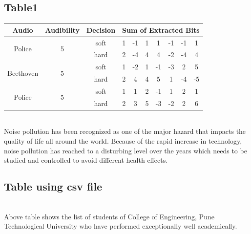 \documentclass{article}
\begin{document}
\subsection{Table1}
\begin{tabular}{|c|c|c|c|c|c|c|c|c|c|}
\hline 
Audio & Audibility & Decision  & \multicolumn{7}{|c|}{Sum of Extracted Bits}\\
\hline
\multirow{2}{*}{Police} & \multirow{2}{*}{5} & soft & 1 & -1 & 1 & 1 & -1 & -1 & 1\\ 
&  & hard & 2 & -4 & 4 & 4 & -2 & -4 & 4\\ \hline
\multirow{2}{*}{Beethoven} & \multirow{2}{*}{5} & soft & 1 & -2 & 1 & -1 & -3 & 2 & 5\\
 &  & hard & 2 & 4 & 4 & 5 & 1 & -4 & -5\\ \hline
\multirow{2}{*}{Police} & \multirow{2}{*}{5} & soft & 1 & 1 & 2 & -1 & 1 & 2 & 1\\
 &  & hard & 2 & 3 & 5 & -3 & -2 & 2 & 6\\
\hline
\end{tabular}
\vspace{1cm}
\\
Noise pollution has been recognized as one of the major hazard that impacts the quality of life all around the world. Because of the rapid increase in technology, noise pollution has reached to a disturbing level over the years which needs to be studied and controlled to avoid different health effects.
\subsection{Table using csv file}
\vspace{0.7cm}
\\
Above table shows the list of students of College of Engineering, Pune Technological University who have performed exceptionally well academically.
\end{document}
